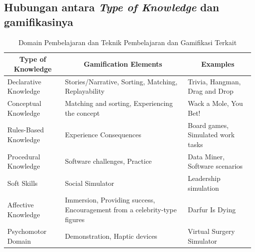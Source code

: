 \subsection{Hubungan antara \textit{Type of Knowledge} dan gamifikasinya}
 \begin{table}[H]
	\caption{Domain Pembelajaran dan Teknik Pembelajaran dan Gamifikasi Terkait \cite{kapp2012gamification}}
	\vspace{0.5em}
	\centering
	\begin{tabular}{|m{5cm}|m{5cm}|m{4cm}|}
		\hline
        \multicolumn{1}{|c|}{\textbf{Type of Knowledge}} & \multicolumn{1}{c|}{\textbf{Gamification Elements}} & \multicolumn{1}{c|}{\textbf{Examples}} \\ 
		\hline 
        \hline
		Declarative Knowledge & Stories/Narrative, Sorting, Matching, Replayability & Trivia, Hangman, Drag and Drop \\\hline
		Conceptual Knowledge & Matching and sorting, Experiencing the concept  & Wack a Mole, You Bet! \\\hline
		Rules-Based Knowledge  & Experience Consequences  & Board games, Simulated work tasks \\ \hline
        Procedural Knowledge  & Software challenges, Practice & Data Miner, Software scenarios \\\hline
        Soft Skills & Social Simulator  & Leadership simulation  \\\hline
        Affective Knowledge & Immersion, Providing success, Encouragement from a celebrity-type figures  & Darfur Is Dying  \\\hline
        Psychomotor Domain & Demonstration, Haptic devices  & Virtual Surgery Simulator  \\
        \hline
	\end{tabular}
	\label{Tab: Tabel Type of Knowledge and Gamification}
\end{table}
